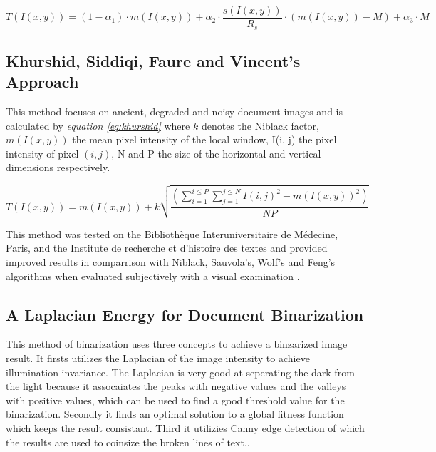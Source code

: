 \documentclass[11pt]{article}
\begin{document}
				\begin{large}
				\begin{equation} \label{eq:feng}
					T(I(x, y)) = (1 - \alpha_1) \cdot m(I(x, y)) + \alpha_2 \cdot \frac{s(I(x, y))}{R_s} \cdot (m(I(x, y)) - M) + \alpha_3  \cdot M
				\end{equation}
				\end{large}

  		\subsection{Khurshid, Siddiqi, Faure and Vincent's Approach}%
  			This method focuses on ancient, degraded and noisy document images and is calculated by \textit{equation \ref{eq:khurshid}} where $k$ denotes the Niblack factor, $m(I(x, y))$ the mean pixel intensity of the local window, I(i, j) the pixel intensity of pixel $(i, j)$, N and P the size of the horizontal and vertical dimensions respectively.\\

				\begin{Large}
				\begin{equation} \label{eq:khurshid}
					T(I(x, y)) = m(I(x, y)) + k \sqrt{\frac{(\displaystyle\sum_{i=1}^{i \leq P}\sum_{j=1}^{j \leq N} I(i, j)^2 - m(I(x, y))^2)}{NP}}
				\end{equation}
				\end{Large}

  			This method was tested on  the Bibliothèque Interuniversitaire de Médecine, Paris, and  the Institute de recherche et d’histoire des textes and provided improved results in comparrison with Niblack, Sauvola's, Wolf's and Feng's algorithms when evaluated subjectively with a visual examination \cite{khurshid2009comparison}.

  		\subsection{A Laplacian Energy for Document Binarization}%
  			This method of binarization uses three concepts to achieve a binzarized image result. It firsts utilizes the Laplacian of the image intensity to achieve illumination invariance. The Laplacian is very good at seperating the dark from the light because it assocaiates the peaks with negative values and the valleys with positive values, which can be used to find a good threshold value for the binarization. Secondly it finds an optimal  solution to a global fitness function which keeps the result consistant. Third it utilizies Canny edge detection of which the results are used to coinsize the broken lines of text.\cite{howe2011laplacian}.\\
\end{document}

